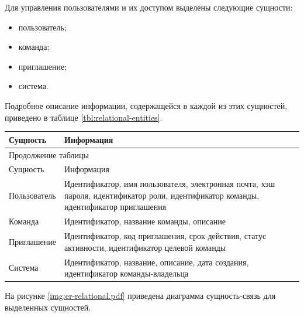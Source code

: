 Для управления пользователями и их доступом выделены следующие сущности: 
\begin{itemize}
    \item пользователь;
    \item команда;
    \item приглашение;
    \item система.
\end{itemize} 

Подробное описание информации, содержащейся в каждой из этих сущностей, 
приведено в таблице \ref{tbl:relational-entities}.

\begin{center}
    \begin{tabularx}{\textwidth}{|X|X|}
        \caption{\label{tbl:relational-entities}Сущности системы для управления доступом} \\ \hline
        Сущность & Информация \\ \hline
        \endfirsthead

        \multicolumn{2}{l}{{Продолжение таблицы\ \thetable{}}} \\ \hline
        Сущность & Информация \\ \hline
        \endhead

        \endfoot
        \endlastfoot

        Пользователь & Идентификатор, имя пользователя, электронная почта, хэш
        пароля, идентификатор роли, идентификатор команды, идентификатор приглашения \\ \hline

        Команда & Идентификатор, название команды, описание \\ \hline
        
        Приглашение & Идентификатор, код приглашения, срок действия, статус
        активности, идентификатор целевой команды \\ \hline
        
        Система & Идентификатор, название, описание, дата создания, идентификатор
        команды-владельца \\ \hline
    \end{tabularx}
\end{center}

На рисунке \ref{img:er-relational.pdf} приведена диаграмма сущность-связь 
для выделенных сущностей.

\clearpage


